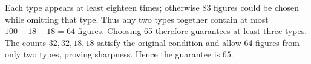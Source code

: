 Each type appears at least eighteen times; otherwise 83 figures could be chosen while omitting that type. Thus any two types together contain at most $100-18-18=64$ figures. Choosing 65 therefore guarantees at least three types. The counts $32,32,18,18$ satisfy the original condition and allow 64 figures from only two types, proving sharpness. Hence the guarantee is $\boxed{65}$.
